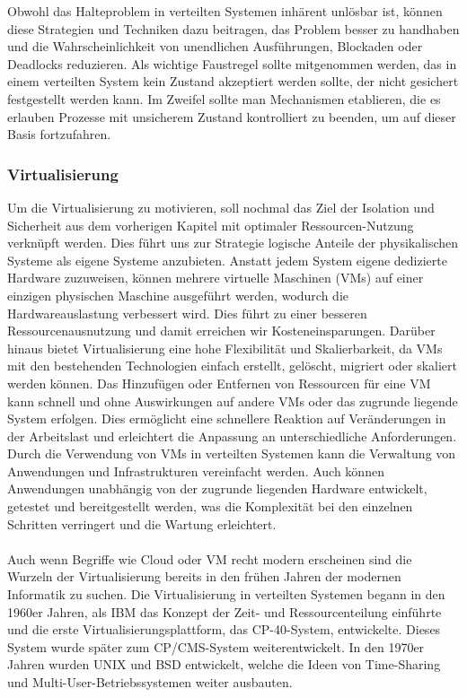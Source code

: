 Obwohl das Halteproblem in verteilten Systemen inhärent unlösbar ist, können diese Strategien und Techniken dazu beitragen, das Problem besser zu handhaben und die Wahrscheinlichkeit von unendlichen Ausführungen, Blockaden oder Deadlocks reduzieren. 
Als wichtige Faustregel sollte mitgenommen werden, das in einem verteilten System kein Zustand akzeptiert werden sollte, der nicht gesichert festgestellt werden kann. Im Zweifel sollte man Mechanismen etablieren, die es erlauben Prozesse mit unsicherem Zustand kontrolliert zu beenden, um auf dieser Basis fortzufahren. 

\subsubsection{Virtualisierung}
Um die Virtualisierung zu motivieren, soll nochmal das Ziel der Isolation und Sicherheit aus dem vorherigen Kapitel mit optimaler Ressourcen-Nutzung verknüpft werden. Dies führt uns zur Strategie logische Anteile der physikalischen Systeme als eigene Systeme anzubieten. Anstatt jedem System eigene dedizierte Hardware zuzuweisen, können mehrere virtuelle Maschinen (VMs) auf einer einzigen physischen Maschine ausgeführt werden, wodurch die Hardwareauslastung verbessert wird. Dies führt zu einer besseren Ressourcenausnutzung und damit erreichen wir Kosteneinsparungen. Darüber hinaus bietet Virtualisierung eine hohe Flexibilität und Skalierbarkeit, da VMs mit den bestehenden Technologien einfach erstellt, gelöscht, migriert oder skaliert werden können. Das Hinzufügen oder Entfernen von Ressourcen für eine VM kann schnell und ohne Auswirkungen auf andere VMs oder das zugrunde liegende System erfolgen. Dies ermöglicht eine schnellere Reaktion auf Veränderungen in der Arbeitslast und erleichtert die Anpassung an unterschiedliche Anforderungen. Durch die Verwendung von VMs in verteilten Systemen kann die Verwaltung von Anwendungen und Infrastrukturen vereinfacht werden. Auch können Anwendungen unabhängig von der zugrunde liegenden Hardware entwickelt, getestet und bereitgestellt werden, was die Komplexität bei den einzelnen Schritten verringert und die Wartung erleichtert. 
\\\\
Auch wenn Begriffe wie Cloud oder VM recht modern erscheinen sind die Wurzeln der Virtualisierung bereits in den frühen Jahren der modernen Informatik zu suchen. Die Virtualisierung in verteilten Systemen begann in den 1960er Jahren, als IBM das Konzept der Zeit- und Ressourcenteilung einführte und die erste Virtualisierungsplattform, das CP-40-System, entwickelte. Dieses System wurde später zum CP/CMS-System weiterentwickelt. In den 1970er Jahren wurden UNIX und BSD entwickelt, welche die Ideen von Time-Sharing und Multi-User-Betriebssystemen weiter ausbauten.
